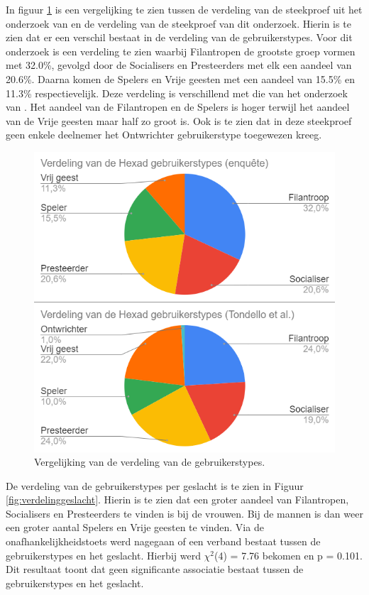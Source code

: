 In figuur \ref{fig:vergelijkingonderzoek} is een vergelijking te zien tussen de verdeling van de steekproef uit het onderzoek van \textcite{Tondello2016} en de verdeling van de steekproef van dit onderzoek. Hierin is te zien dat er een verschil bestaat in de verdeling van de gebruikerstypes. Voor dit onderzoek is een verdeling te zien waarbij Filantropen de grootste groep vormen met 32.0\%, gevolgd door de Socialisers en Presteerders met elk een aandeel van 20.6\%. Daarna komen de Spelers en Vrije geesten met een aandeel van 15.5\% en 11.3\% respectievelijk. Deze verdeling is verschillend met die van het onderzoek van \textcite{Tondello2016}. Het aandeel van de Filantropen en de Spelers is hoger terwijl het aandeel van de Vrije geesten maar half zo groot is. Ook is te zien dat in deze steekproef geen enkele deelnemer het Ontwrichter gebruikerstype toegewezen kreeg.

\begin{figure}
    \includegraphics[width=\linewidth]{VergelijkingOnderzoek.png}
    \caption{Vergelijking van de verdeling van de gebruikerstypes.}
    \label{fig:vergelijkingonderzoek}
\end{figure}

De verdeling van de gebruikerstypes per geslacht is te zien in Figuur \ref{fig:verdelinggeslacht}. Hierin is te zien dat een groter aandeel van Filantropen, Socialisers en Presteerders te vinden is bij de vrouwen. Bij de mannen is dan weer een groter aantal Spelers en Vrije geesten te vinden. Via de onafhankelijkheidstoets werd nagegaan of een verband bestaat tussen de gebruikerstypes en het geslacht. Hierbij werd $\chi^2$(4) = 7.76 bekomen en p = 0.101. Dit resultaat toont dat geen significante associatie bestaat tussen de gebruikerstypes en het geslacht.

